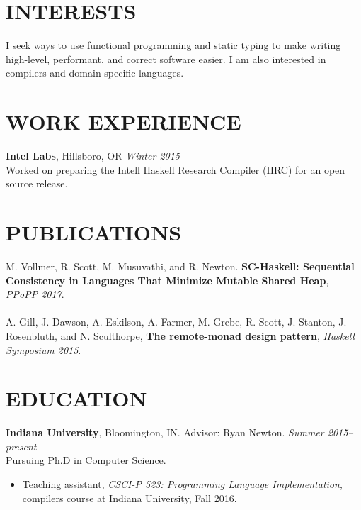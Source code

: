 \documentclass{res}
\begin{document}
\address{\texttt{rgscott@indiana.edu} $\bullet$ \texttt{ryanglscott.github.io}}

\begin{resume}

\section{INTERESTS}
    I seek ways to use functional programming and static typing to make writing high-level, performant, and correct software easier. I am also interested in compilers and domain-specific languages.

\section{WORK EXPERIENCE}
    \textbf{Intel Labs}, Hillsboro, OR \hfill \textit{Winter 2015} \\
    Worked on preparing the Intell Haskell Research Compiler (HRC) for an open source release.

\section{PUBLICATIONS}
        M. Vollmer, R. Scott, M. Musuvathi, and R. Newton. \textbf{SC-Haskell: Sequential Consistency in Languages That Minimize Mutable Shared Heap}, \textit{PPoPP 2017}. \\ \\
        A. Gill, J. Dawson, A. Eskilson, A. Farmer, M. Grebe, R. Scott, J. Stanton, J. Rosenbluth, and N. Sculthorpe, \textbf{The remote-monad design pattern}, \textit{Haskell Symposium 2015}.

\section{EDUCATION}
     \textbf{Indiana University}, Bloomington, IN. Advisor: Ryan Newton. \hfill \textit{Summer 2015--present} \\
    Pursuing Ph.D in Computer Science.
    \begin{itemize}
     \item Teaching assistant, \textit{CSCI-P 523: Programming Language Implementation}, compilers course at Indiana University, Fall 2016.
    \end{itemize}


\end{resume}
\end{document}
